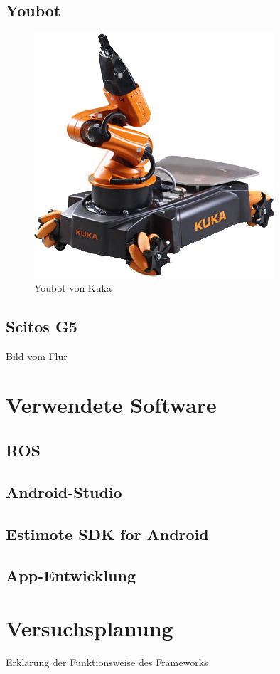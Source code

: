 \subsection{Youbot}
\begin{figure}[H] 
\centering
\includegraphics[scale=0.5]{Bilder/Youbot}
\caption{Youbot von Kuka \cite{You}}
\end{figure}
\subsection{Scitos G5}
Bild vom Flur

\section{Verwendete Software}
\subsection{ROS}
\subsection{Android-Studio}
\subsection{Estimote SDK for Android}
\subsection{App-Entwicklung}

\section{Versuchsplanung}
Erklärung der Funktionsweise des Frameworks

